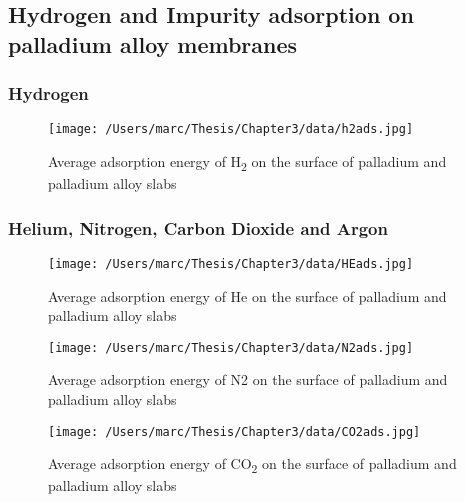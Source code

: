 \subsection{Hydrogen and Impurity adsorption on palladium alloy membranes}
\subsubsection{Hydrogen}

\begin{landscape}
\begin{figure}
    \centering
    \texttt{[image: /Users/marc/Thesis/Chapter3/data/h2ads.jpg]}
    \caption{Average adsorption energy of H\textsubscript{2} on the surface of palladium and palladium alloy slabs}
    \label{h2ads}
  \end{figure}

\end{landscape}
\subsubsection{Helium, Nitrogen, Carbon Dioxide and Argon}

\begin{landscape}
  \begin{figure}
      \centering
      \texttt{[image: /Users/marc/Thesis/Chapter3/data/HEads.jpg]}
      \caption{Average adsorption energy of He on the surface of palladium and palladium alloy slabs}
      \label{heads}
    \end{figure}
  
  \end{landscape}

  \begin{landscape}
    \begin{figure}
        \centering
        \texttt{[image: /Users/marc/Thesis/Chapter3/data/N2ads.jpg]}
        \caption{Average adsorption energy of N2 on the surface of palladium and palladium alloy slabs}
        \label{n2ads}
      \end{figure}
    
    \end{landscape}


\begin{landscape}
    \begin{figure}
        \centering
        \texttt{[image: /Users/marc/Thesis/Chapter3/data/CO2ads.jpg]}
        \caption{Average adsorption energy of CO\textsubscript{2} on the surface of palladium and palladium alloy slabs}
        \label{co2ads}
      \end{figure}
    
    \end{landscape}

